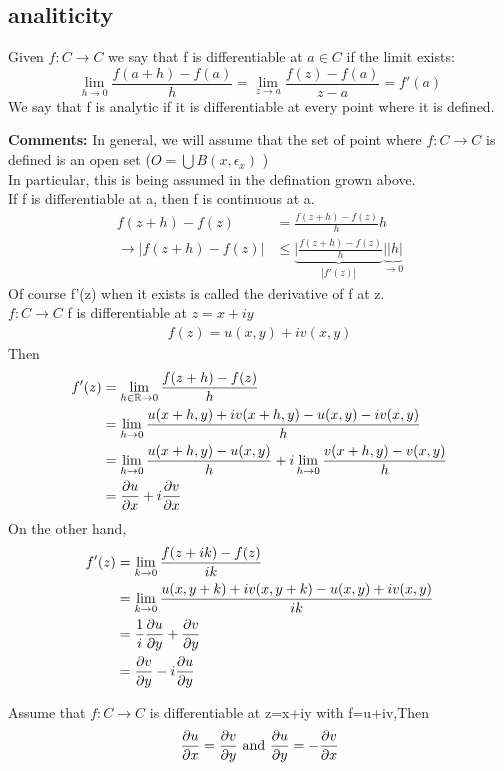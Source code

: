 \subsection{analiticity}
\begin{definition}{}
Given $ f:C\rightarrow C $ we say that f is differentiable at $ a\in C $ if the limit exists: $$
    \lim_{h\rightarrow0}\frac{f(a+h)-f(a)}{h}=\lim_{z\rightarrow a}\frac{f(z)-f(a)}{z-a}=f'(a)
$$   
We say that f is analytic if it is differentiable at every point where it is defined.
\end{definition}
\textbf{Comments:}
In general, we will assume that the set of point where $f: C\rightarrow C $ is defined is an open set ($ O=\bigcup B(x,\epsilon_x) $ )
\\In particular, this is being assumed in the defination grown above.
\\If f is differentiable at a, then f is continuous at a.
\begin{align*}{}{}
f(z+h)-f(z)&=\frac{f(z+h)-f(z)}{h}h\\
\rightarrow |f(z+h)-f(z)|&\leq \underbrace{|\frac{f(z+h)-f(z)}{h}}_{|f'(z)|}\underbrace{||h|}_{\rightarrow0}
\end{align*}
Of course f'(z) when it exists is called the derivative of f at z.\\
$ f:C\rightarrow C $  f is differentiable at $ z=x+iy $ 
\begin{align*}{}{}
f(z)=u(x,y)+iv(x,y)
\end{align*}
Then \begin{align*}{}{}
f'(z)&=\lim_{h\in \mathbb{R}\rightarrow0}\frac{f(z+h)-f(z)}{h}\\
&=\lim_{h\rightarrow0}\frac{u(x+h,y)+iv(x+h,y)-u(x,y)-iv(x,y)}{h}\\
&=\lim_{h\rightarrow0}\frac{u(x+h,y)-u(x,y)}{h}+i\lim_{h\rightarrow0}\frac{v(x+h,y)-v(x,y)}{h}\\
&=\pdv{u}{x}+i\pdv{v}{x}
\end{align*}  
On the other hand,
\begin{align*}{}{}
    f'(z)&=\lim_{k\rightarrow0}\frac{f(z+ik)-f(z)}{ik}\\
    &=\lim_{k\rightarrow0}\frac{u(x,y+k)+iv(x,y+k)-u(x,y)+iv(x,y)}{ik}\\
&=\frac{1}{i}\pdv{u}{y}+\pdv{v}{y}\\
&=\pdv{v}{y}-i\pdv{u}{y}
\end{align*} 
\begin{lemma}{}
Assume that $ f:C\rightarrow C $ is differentiable at z=x+iy with f=u+iv,Then$$
    \pdv{u}{x}=\pdv{v}{y}\text{ and }\pdv{u}{y}=-\pdv{v}{x}
$$ 
\end{lemma}
